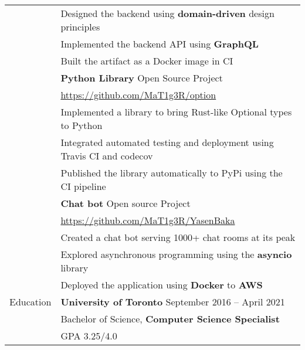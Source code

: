 \documentclass[letterpaper,12pt,oneside]{article}
\newcommand{\smallurl}[1]{\scriptsize{\url{#1}}}
\newcommand{\tabitem}{\hspace{0.2cm}\textbullet\hspace{0.2cm}}
\begin{document}
\begin{longtable}{@{} l p{14cm}}
& \tabitem
Designed the backend using \textbf{domain-driven} design principles \\
& \tabitem
Implemented the backend API using \textbf{GraphQL} \\
& \tabitem Built the artifact as a Docker image in CI \\
& \textbf{Python Library}\hspace*{\fill} Open Source Project \\
& \smallurl{https://github.com/MaT1g3R/option} \\
& \tabitem
Implemented a library to bring Rust-like Optional types to Python \\
& \tabitem
Integrated automated testing and deployment using Travis CI and codecov \\
& \tabitem Published the library automatically to PyPi using the CI pipeline \\
& \textbf{Chat bot}\hspace*{\fill} Open source Project \\
& \smallurl{https://github.com/MaT1g3R/YasenBaka} \\
& \tabitem
Created a chat bot serving 1000+ chat rooms at its peak \\
& \tabitem
Explored asynchronous programming using the \textbf{asyncio} library \\
& \tabitem
Deployed the application using \textbf{Docker} to \textbf{AWS} \\
\Large{Education}
& \textbf{University of Toronto} \hspace*{\fill} September 2016 -- April 2021 \\
& \tabitem
Bachelor of Science, \textbf{Computer Science Specialist} \\
& \tabitem
GPA 3.25/4.0
\end{longtable}
\end{document}
